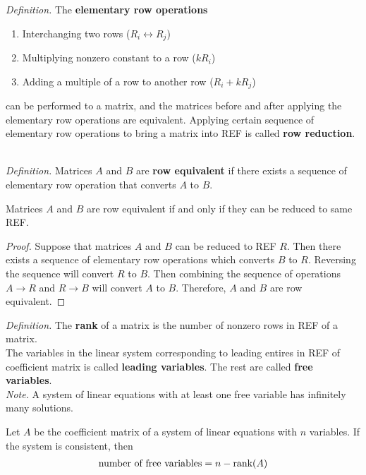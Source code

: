 \noindent \textit{Definition.} The \textbf{elementary row operations}
\begin{enumerate}
	\item Interchanging two rows ($R_i \leftrightarrow R_j$)
	\item Multiplying nonzero constant to a row ($kR_i$)
	\item Adding a multiple of a row to another row ($R_i + kR_j$)
\end{enumerate}
can be performed to a matrix, and the matrices before and after applying the elementary row operations are equivalent.
Applying certain sequence of elementary row operations to bring a matrix into REF is called \textbf{row reduction}.

\noindent \\ \textit{Definition.} Matrices $A$ and $B$ are \textbf{row equivalent} if there exists a sequence of elementary row operation that converts $A$ to $B$.

\begin{theorem}
	Matrices $A$ and $B$ are row equivalent if and only if they can be reduced to same REF.
\end{theorem}
\begin{proof}
	Suppose that matrices $A$ and $B$ can be reduced to REF $R$. Then there exists a sequence of elementary row operations which converts $B$ to $R$. Reversing the sequence will convert $R$ to $B$. Then combining the sequence of operations $A \rightarrow R$ and $R \rightarrow B$ will convert $A$ to $B$. Therefore, $A$ and $B$ are row equivalent.
\end{proof}

\noindent \textit{Definition.} The \textbf{rank} of a matrix is the number of nonzero rows in REF of a matrix. \\

\noindent The variables in the linear system corresponding to leading entires in REF of coefficient matrix is called \textbf{leading variables}. The rest are called \textbf{free variables}. \\

\noindent \textit{Note.} A system of linear equations with at least one free variable has infinitely many solutions.

\begin{theorem}
	Let $A$ be the coefficient matrix of a system of linear equations with $n$ variables. If the system is consistent, then \begin{align*}
		\textnormal{number of free variables} = n - \textnormal{rank}(A)
	\end{align*}
\end{theorem}

